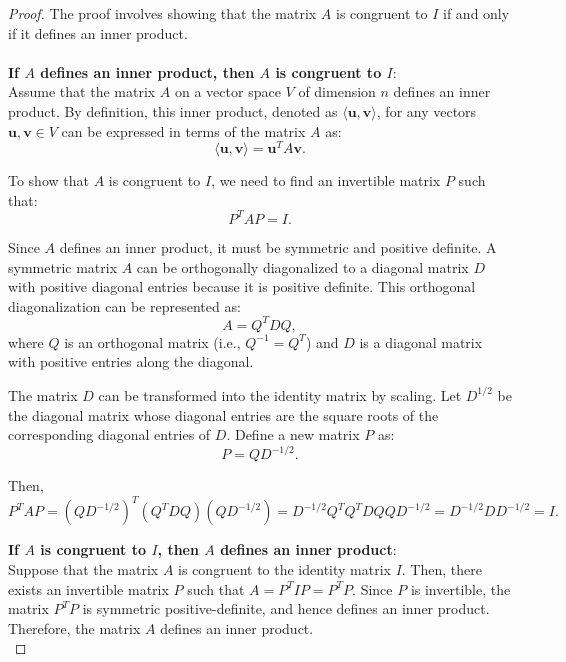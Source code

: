\documentclass[11pt]{book} %
\begin{document}
\begin{proof}
    The proof involves showing that the matrix \( A \) is congruent to \( I \) if and only if it defines an inner product. \\
    \\
    \textbf{If \( A \) defines an inner product, then \( A \) is congruent to \( I \)}: \\
    Assume that the matrix \( A \) on a vector space \( V \) of dimension \( n \) defines an inner product. By definition, this inner product, denoted as \( \langle \mathbf{u}, \mathbf{v} \rangle \), for any vectors \( \mathbf{u}, \mathbf{v} \in V \) can be expressed in terms of the matrix \( A \) as:
    \[
    \langle \mathbf{u}, \mathbf{v} \rangle = \mathbf{u}^T A \mathbf{v}.
    \]

    To show that \( A \) is congruent to \( I \), we need to find an invertible matrix \( P \) such that:
    \[
    P^T A P = I.
    \]

    Since \( A \) defines an inner product, it must be symmetric and positive definite. A symmetric matrix \( A \) can be orthogonally diagonalized to a diagonal matrix \( D \) with positive diagonal entries because it is positive definite. This orthogonal diagonalization can be represented as:
    \[
    A = Q^T D Q,
    \]
    where \( Q \) is an orthogonal matrix (i.e., \( Q^{-1} = Q^T \)) and \( D \) is a diagonal matrix with positive entries along the diagonal.

    The matrix \( D \) can be transformed into the identity matrix by scaling. Let \( D^{1/2} \) be the diagonal matrix whose diagonal entries are the square roots of the corresponding diagonal entries of \( D \). Define a new matrix \( P \) as:
    \[
    P = Q D^{-1/2}.
    \]

    Then,
    \[
    P^T A P = (Q D^{-1/2})^T (Q^T D Q) (Q D^{-1/2}) = D^{-1/2} Q^T Q^T D Q Q D^{-1/2} = D^{-1/2} D D^{-1/2} = I.
    \]

    \medbreak
    \textbf{If \( A \) is congruent to \( I \), then \( A \) defines an inner product}: \\
    Suppose that the matrix \( A \) is congruent to the identity matrix \( I \). Then, there exists an invertible matrix \( P \) such that \( A = P^T I P = P^T P \). 
    Since \( P \) is invertible, the matrix \( P^T P \) is symmetric positive-definite, and hence defines an inner product. 
    Therefore, the matrix \( A \) defines an inner product. \\

\end{proof}
\end{document}
